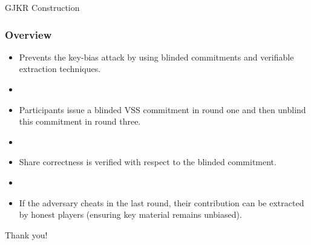 \documentclass[hyperref={pdfpagelabels=true},table,dvipsnames,14pt,aspectratio=169]{beamer}
\begin{document}
\begin{frame}
  \centering
{}
\end{frame}


\begin{frame}
  \huge
  \centering
  GJKR Construction
\end{frame}

\begin{frame}
  \frametitle{Overview}

  \begin{itemize}
    \item Prevents the key-bias attack by using blinded commitments and verifiable extraction techniques.
    \item[]
    \item<2-> Participants issue a blinded VSS commitment in round one and then unblind this commitment in round three.
    \item[]
    \item<3-> Share correctness is verified with respect to the blinded commitment.
    \item[]
    \item<4-> If the adversary cheats in the last round, their contribution can be extracted by honest players (ensuring key material remains unbiased).
  \end{itemize}
\end{frame}


\begin{frame}

  \huge
  \centering
  Thank you!
\end{frame}
\end{document}
